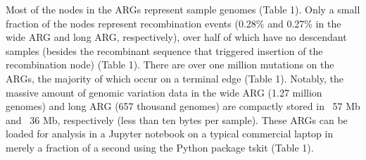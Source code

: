 \documentclass{article}
\begin{document}

Most of the nodes in the ARGs represent sample genomes (Table 1). Only a small
fraction of the nodes represent recombination events (0.28\% and 0.27\% in the
wide ARG and long ARG, respectively), over half of which have no descendant
samples (besides the recombinant sequence that triggered insertion of the
recombination node) (Table 1). There are over one million mutations on the
ARGs, the majority of which occur on a terminal edge (Table 1). Notably, the
massive amount of genomic variation data in the wide ARG (1.27 million genomes)
and long ARG (657 thousand genomes) are compactly stored in ~57 Mb and ~36 Mb,
respectively (less than ten bytes per sample). These ARGs can be loaded for
analysis in a Jupyter notebook on a typical commercial laptop in merely a
fraction of a second using the Python package tskit (Table 1).
\end{document}
